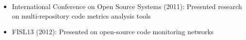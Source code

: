 \begin{itemize}
\begin{itemize}[itemsep=1pt, parsep=0pt]
              \item \footnotesize{International Conference on Open Source Systems (2011): Presented research on multi-repository code metrics analysis tools}
              \item \footnotesize{FISL13 (2012): Presented on open-source code monitoring networks}
          \end{itemize}
\end{itemize}